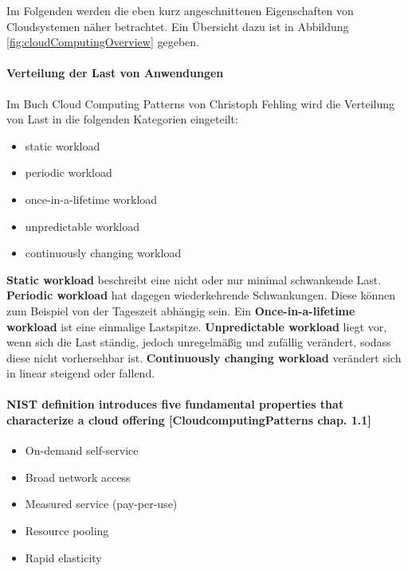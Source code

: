 \documentclass[a4paper,10pt]{article}
\numberwithin{figure}{section}
\numberwithin{table}{section}
\begin{document}
Im Folgenden werden die eben kurz angeschnittenen Eigenschaften von Cloudsystemen näher betrachtet.
Ein Übersicht dazu ist in Abbildung \ref{fig:cloudComputingOverview} gegeben.

\paragraph{Verteilung der Last von Anwendungen}

Im Buch Cloud Computing Patterns von Christoph Fehling wird die Verteilung von Last in die folgenden Kategorien eingeteilt:

\begin{itemize}
 \item static workload
 \item periodic workload
 \item once-in-a-lifetime workload
 \item unpredictable workload
 \item continuously changing workload
\end{itemize}

\textbf{Static workload} beschreibt eine nicht oder nur minimal schwankende Last.
\textbf{Periodic workload} hat dagegen wiederkehrende Schwankungen. Diese können zum Beispiel von der Tageszeit abhängig sein.
Ein \textbf{Once-in-a-lifetime workload} ist eine einmalige Lastspitze.
\textbf{Unpredictable workload} liegt vor, wenn sich die Last ständig, jedoch unregelmäßig und zufällig verändert, sodass diese nicht vorhersehbar ist.
\textbf{Continuously changing workload} verändert sich in linear steigend oder fallend.

\paragraph{NIST definition introduces five fundamental properties that characterize a cloud offering [CloudcomputingPatterns chap. 1.1]}

\begin{itemize}
 \item On-demand self-service
 \item Broad network access
 \item Measured service (pay-per-use)
 \item Resource pooling
 \item Rapid elasticity
\end{itemize}
\end{document}
